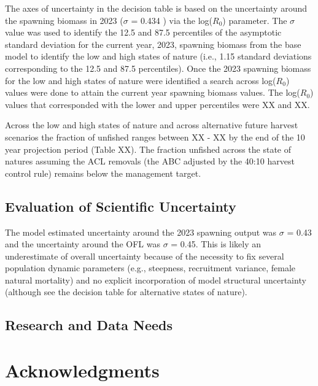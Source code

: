\documentclass[11pt,
  english,
  letterpaper,
]{article}
\begin{document}
The axes of uncertainty in the decision table is based on the uncertainty around the spawning biomass in 2023 (\(\sigma\) = 0.434 ) via the log(\(R_0\)) parameter. The \(\sigma\) value was used to identify the 12.5 and 87.5 percentiles of the asymptotic standard deviation for the current year, 2023, spawning biomass from the base model to identify the low and high states of nature (i.e., 1.15 standard deviations corresponding to the 12.5 and 87.5 percentiles). Once the 2023 spawning biomass for the low and high states of nature were identified a search across log(\(R_0\)) values were done to attain the current year spawning biomass values. The log(\(R_0\)) values that corresponded with the lower and upper percentiles were XX and XX.

Across the low and high states of nature and across alternative future harvest scenarios the fraction of unfished ranges between XX - XX by the end of the 10 year projection period (Table XX). The fraction unfished across the state of natures assuming the ACL removals (the ABC adjusted by the 40:10 harvest control rule) remains below the management target.

\hypertarget{evaluation-of-scientific-uncertainty}{%
\subsection{Evaluation of Scientific Uncertainty}\label{evaluation-of-scientific-uncertainty}}

The model estimated uncertainty around the 2023 spawning output was \(\sigma\) = 0.43 and the uncertainty around the OFL was \(\sigma\) = 0.45. This is likely an underestimate of overall uncertainty because of the necessity to fix several population dynamic parameters (e.g., steepness, recruitment variance, female natural mortality) and no explicit incorporation of model structural uncertainty (although see the decision table for alternative states of nature).

\hypertarget{research-and-data-needs-1}{%
\subsection{Research and Data Needs}\label{research-and-data-needs-1}}

\hypertarget{acknowledgments}{%
\section{Acknowledgments}\label{acknowledgments}}
\end{document}
